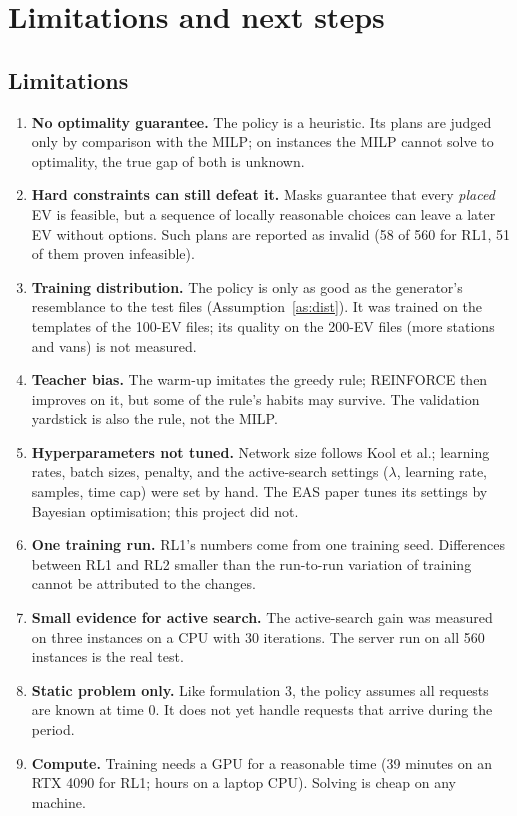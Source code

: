 \section{Limitations and next steps}
\label{sec:limits}

\subsection{Limitations}

\begin{enumerate}
  \item \textbf{No optimality guarantee.} The policy is a heuristic. Its plans are judged only by comparison with the MILP; on instances the MILP cannot solve to optimality, the true gap of both is unknown.
  \item \textbf{Hard constraints can still defeat it.} Masks guarantee that every \emph{placed} EV is feasible, but a sequence of locally reasonable choices can leave a later EV without options. Such plans are reported as invalid (58 of 560 for RL1, 51 of them proven infeasible).
  \item \textbf{Training distribution.} The policy is only as good as the generator's resemblance to the test files (Assumption~\ref{as:dist}). It was trained on the templates of the 100-EV files; its quality on the 200-EV files (more stations and vans) is not measured.
  \item \textbf{Teacher bias.} The warm-up imitates the greedy rule; REINFORCE then improves on it, but some of the rule's habits may survive. The validation yardstick is also the rule, not the MILP.
  \item \textbf{Hyperparameters not tuned.} Network size follows Kool et al.; learning rates, batch sizes, penalty, and the active-search settings ($\lambda$, learning rate, samples, time cap) were set by hand. The EAS paper tunes its settings by Bayesian optimisation; this project did not.
  \item \textbf{One training run.} RL1's numbers come from one training seed. Differences between RL1 and RL2 smaller than the run-to-run variation of training cannot be attributed to the changes.
  \item \textbf{Small evidence for active search.} The active-search gain was measured on three instances on a CPU with 30 iterations. The server run on all 560 instances is the real test.
  \item \textbf{Static problem only.} Like formulation 3, the policy assumes all requests are known at time 0. It does not yet handle requests that arrive during the period.
  \item \textbf{Compute.} Training needs a GPU for a reasonable time (39 minutes on an RTX 4090 for RL1; hours on a laptop CPU). Solving is cheap on any machine.
\end{enumerate}

